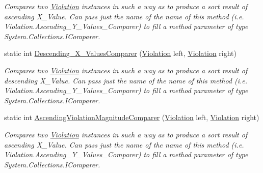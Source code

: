 \begin{DoxyCompactItemize}
\begin{DoxyCompactList}\small\item\em Compares two \mbox{\hyperlink{class_c_s_i_1_1_library_1_1_array_utilities_1_1_array_limit_checks_1_1_violation}{Violation}} instances in such a way as to produce a sort result of ascending X\+\_\+\+Value. Can pass just the name of the name of this method (i.\+e. Violation.\+Ascending\+\_\+\+Y\+\_\+\+Values\+\_\+\+Comparer) to fill a method parameter of type System.\+Collections.\+I\+Comparer. \end{DoxyCompactList}\item 
static int \mbox{\hyperlink{class_c_s_i_1_1_library_1_1_array_utilities_1_1_array_limit_checks_1_1_violation_a697887c43a44ef0ce30e74359fa3f1ea}{Descending\+\_\+\+X\+\_\+\+Values\+Comparer}} (\mbox{\hyperlink{class_c_s_i_1_1_library_1_1_array_utilities_1_1_array_limit_checks_1_1_violation}{Violation}} left, \mbox{\hyperlink{class_c_s_i_1_1_library_1_1_array_utilities_1_1_array_limit_checks_1_1_violation}{Violation}} right)
\begin{DoxyCompactList}\small\item\em Compares two \mbox{\hyperlink{class_c_s_i_1_1_library_1_1_array_utilities_1_1_array_limit_checks_1_1_violation}{Violation}} instances in such a way as to produce a sort result of descending X\+\_\+\+Value. Can pass just the name of the name of this method (i.\+e. Violation.\+Ascending\+\_\+\+Y\+\_\+\+Values\+\_\+\+Comparer) to fill a method parameter of type System.\+Collections.\+I\+Comparer. \end{DoxyCompactList}\item 
static int \mbox{\hyperlink{class_c_s_i_1_1_library_1_1_array_utilities_1_1_array_limit_checks_1_1_violation_a647e6fc658bf99fef6b59014364876a0}{Ascending\+Violation\+Magnitude\+Comparer}} (\mbox{\hyperlink{class_c_s_i_1_1_library_1_1_array_utilities_1_1_array_limit_checks_1_1_violation}{Violation}} left, \mbox{\hyperlink{class_c_s_i_1_1_library_1_1_array_utilities_1_1_array_limit_checks_1_1_violation}{Violation}} right)
\begin{DoxyCompactList}\small\item\em Compares two \mbox{\hyperlink{class_c_s_i_1_1_library_1_1_array_utilities_1_1_array_limit_checks_1_1_violation}{Violation}} instances in such a way as to produce a sort result of ascending X\+\_\+\+Value. Can pass just the name of the name of this method (i.\+e. Violation.\+Ascending\+\_\+\+Y\+\_\+\+Values\+\_\+\+Comparer) to fill a method parameter of type System.\+Collections.\+I\+Comparer. \end{DoxyCompactList}\item 

\end{DoxyCompactItemize}
